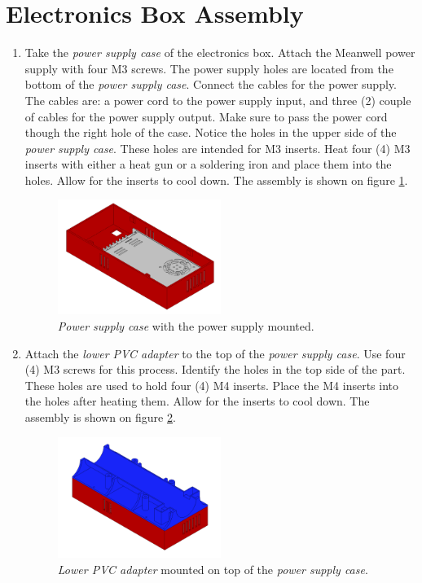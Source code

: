 \documentclass{article}
\begin{document}
\newpage
\section{Electronics Box Assembly}
\begin{enumerate}
    
    \item Take the \textit{power supply case} of the electronics box. Attach the Meanwell power supply with four M3 screws. The power supply holes are located from the bottom of the \textit{power supply case}. Connect the cables for the power supply. The cables are: a power cord to the power supply input, and three (2) couple of cables for the power supply output. Make sure to pass the power cord though the right hole of the case. Notice the holes in the upper side of the \textit{power supply case}. These holes are intended for M3 inserts. Heat four (4) M3 inserts with either a heat gun or a soldering iron and place them into the holes. Allow for the inserts to cool down. The assembly is shown on figure \ref{fig:electronics_1}.
    
    \begin{figure}[H]
        \centering
        \includegraphics[width=0.5\textwidth]{images/electronics/step_A.png}
        \caption{\textit{Power supply case} with the power supply mounted.}
        \label{fig:electronics_1}
    \end{figure}
    
    \item Attach the \textit{lower PVC adapter} to the top of the \textit{power supply case}. Use four (4) M3 screws for this process. Identify the holes in the top side of the part. These holes are used to hold four (4) M4 inserts. Place the M4 inserts into the holes after heating them. Allow for the inserts to cool down. The assembly is shown on figure \ref{fig:electronics_2}.
    
    \begin{figure}[H]
        \centering
        \includegraphics[width=0.5\textwidth]{images/electronics/step_B.png}
        \caption{\textit{Lower PVC adapter} mounted on top of the \textit{power supply case}.}
        \label{fig:electronics_2}
    \end{figure}
    

\end{enumerate}
\end{document}
